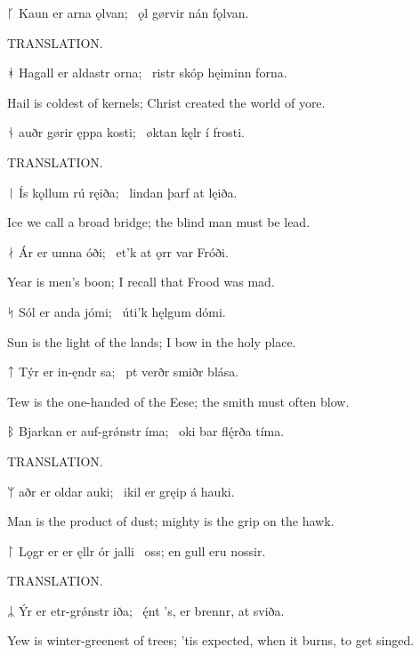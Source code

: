 \bvg\bva%
ᚴ Kaun er arna ǫlvan; \hld\ ǫl gørvir nán fǫlvan.\eva

\bvb TRANSLATION.\evb\evg


\bvg\bva%
ᚼ Hagall er aldastr orna; \hld\ ristr skóp hęiminn forna.\eva

\bvb Hail is coldest of kernels; Christ created the world of yore.\evb\evg


\bvg\bva%
ᚾ auðr gørir ęppa kosti; \hld\ øktan kęlr í frosti.\eva

\bvb TRANSLATION.\evb\evg


\bvg\bva%
ᛁ Ís kǫllum rú ręiða; \hld\ lindan þarf at lęiða.\eva

\bvb Ice we call a broad bridge; the blind man must be lead.\evb\evg


\bvg\bva%
ᛅ Ár er umna óði; \hld\ et’k at ǫrr var Fróði.\eva

\bvb Year is men’s boon; I recall that Frood was mad.\evb\evg


\bvg\bva%
ᛋ Sól er anda jómi; \hld\ úti’k hęlgum dómi.\eva

\bvb Sun is the light of the lands; I bow in the holy place.\evb\evg


\bvg\bva%
ᛏ Týr er in-ęndr sa; \hld\ pt verðr smiðr blása.\eva

\bvb Tew is the one-handed of the Eese; the smith must often blow.\evb\evg


\bvg\bva%
ᛒ Bjarkan er auf-grǿnstr íma; \hld\ oki bar flę́rða tíma.\eva

\bvb TRANSLATION.\evb\evg


\bvg\bva%
ᛘ aðr er oldar auki; \hld\ ikil er gręip á hauki.\eva

\bvb Man is the product of dust; mighty is the grip on the hawk.\evb\evg


\bvg\bva%
ᛚ Lǫgr er er ęllr ór jalli \hld\ oss; en gull eru nossir.\eva

\bvb TRANSLATION.\evb\evg


\bvg\bva%
ᛦ Ýr er etr-grǿnstr iða; \hld\ ę́nt ’s, er brennr, at sviða. \eva

\bvb Yew is winter-greenest of trees; ’tis expected, when it burns, to get singed.\evb\evg

\sectionline
